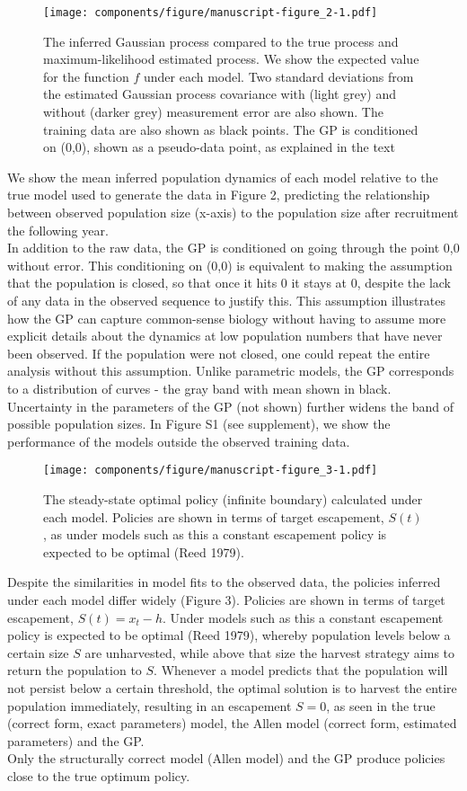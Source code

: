 \documentclass[author-year, 12pt,review]{components/elsarticle} %
\makeatletter
\def\maxwidth{\ifdim\Gin@nat@width>\linewidth\linewidth
\else\Gin@nat@width\fi}
\let\Oldincludegraphics\includegraphics
\renewcommand{\includegraphics}[1]{\Oldincludegraphics[width=\maxwidth]{#1}}
\makeatother
\begin{document}
\begin{figure}[htbp]
\centering
\texttt{[image: components/figure/manuscript-figure\_2-1.pdf]}
\caption{The inferred Gaussian process compared to the true process and
maximum-likelihood estimated process. We show the expected value for the
function $f$ under each model. Two standard deviations from the
estimated Gaussian process covariance with (light grey) and without
(darker grey) measurement error are also shown. The training data are
also shown as black points. The GP is conditioned on (0,0), shown as a
pseudo-data point, as explained in the text}
\end{figure}

We show the mean inferred population dynamics of each model relative to
the true model used to generate the data in Figure 2, predicting the
relationship between observed population size (x-axis) to the population
size after recruitment the following year.\\In addition to the raw data,
the GP is conditioned on going through the point 0,0 without error. This
conditioning on (0,0) is equivalent to making the assumption that the
population is closed, so that once it hits 0 it stays at 0, despite the
lack of any data in the observed sequence to justify this. This
assumption illustrates how the GP can capture common-sense biology
without having to assume more explicit details about the dynamics at low
population numbers that have never been observed. If the population were
not closed, one could repeat the entire analysis without this
assumption. Unlike parametric models, the GP corresponds to a
distribution of curves - the gray band with mean shown in black.
Uncertainty in the parameters of the GP (not shown) further widens the
band of possible population sizes. In Figure S1 (see supplement), we
show the performance of the models outside the observed training data.

\begin{figure}[htbp]
\centering
\texttt{[image: components/figure/manuscript-figure\_3-1.pdf]}
\caption{The steady-state optimal policy (infinite boundary) calculated
under each model. Policies are shown in terms of target escapement,
$S(t)$, as under models such as this a constant escapement policy is
expected to be optimal (Reed 1979).}
\end{figure}

Despite the similarities in model fits to the observed data, the
policies inferred under each model differ widely (Figure 3). Policies
are shown in terms of target escapement, $S(t) = x_t - h$. Under models
such as this a constant escapement policy is expected to be optimal
(Reed 1979), whereby population levels below a certain size $S$ are
unharvested, while above that size the harvest strategy aims to return
the population to $S$. Whenever a model predicts that the population
will not persist below a certain threshold, the optimal solution is to
harvest the entire population immediately, resulting in an escapement
$S=0$, as seen in the true (correct form, exact parameters) model, the
Allen model (correct form, estimated parameters) and the GP.\\Only the
structurally correct model (Allen model) and the GP produce policies
close to the true optimum policy.
\end{document}
